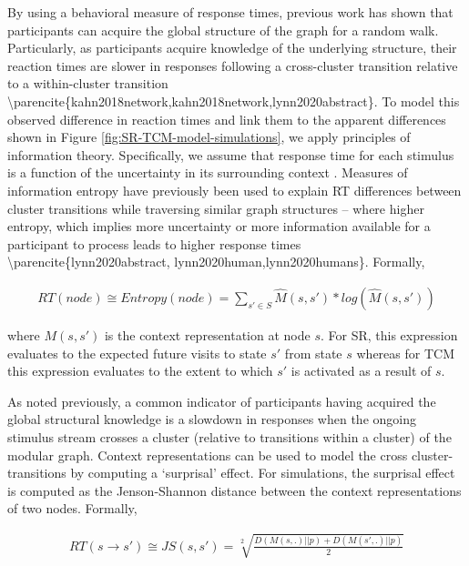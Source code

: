 \ac{By using a behavioral measure of response times, previous work has shown that participants can acquire the global structure of the graph for a random walk. Particularly, as participants acquire knowledge of the underlying structure, their reaction times are slower in responses following a cross-cluster transition relative to a within-cluster transition \parencite{kahn2018network,kahn2018network,lynn2020abstract}.} To model this observed difference in reaction times and link them to the apparent differences shown in Figure \ref{fig:SR-TCM-model-simulations}, we apply principles of information theory. Specifically, we assume that response time for each stimulus is a function of the uncertainty in its surrounding context \parencite{fitts1964information}. Measures of information entropy have previously been used to explain RT differences between cluster transitions while traversing similar graph structures -- \ac{where higher entropy, which implies more uncertainty or more information available for a participant to process leads to higher response times \parencite{lynn2020abstract, lynn2020human,lynn2020humans}.} Formally, 

\begin{equation}
	\begin{aligned}
		RT(node) \cong Entropy(node) = \sum_{s' \in S} \hat{M}(s, s') * log(\hat{M}(s, s'))
	\end{aligned}
\end{equation}

where $M(s, s')$ is the context representation at node $s$. For SR, this expression evaluates to the expected future visits to state $s'$ from state $s$ whereas for TCM this expression evaluates to the extent to which $s'$ is activated as a result of $s$. 

As noted previously, a common indicator of participants having acquired the global structural knowledge is a slowdown in responses when the ongoing stimulus stream crosses a cluster (relative to transitions within a cluster) of the modular graph. Context representations can be used to model the cross cluster-transitions by computing a `surprisal' effect. For simulations, the surprisal effect is computed as the Jenson-Shannon distance between the context representations of two nodes. Formally, 

\begin{equation}
	\begin{aligned}
		RT(s \rightarrow s') \cong JS(s, s') = \sqrt[2]{\frac{D(M(s, .) || p) + D(M(s', .) || p)}{2}} \\
	\end{aligned}
\end{equation}

